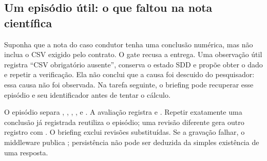 \subsection{Um episódio útil: o que faltou na nota científica}

Suponha que a nota do caso condutor tenha uma conclusão numérica, mas não
inclua o CSV exigido pelo contrato. O gate recusa a entrega. Uma observação
útil registra ``CSV obrigatório ausente'', conserva o estado SDD e propõe
obter o dado e repetir a verificação. Ela não conclui que a causa foi descuido
do pesquisador: essa causa não foi observada. Na tarefa seguinte, o briefing
pode recuperar esse episódio e seu identificador antes de tentar o cálculo.

\begin{arquitetura}
O episódio  separa , ,
, ,  e
. A avaliação registra  e
. Repetir exatamente uma conclusão já registrada
reutiliza o episódio; uma revisão diferente gera outro registro com
. O briefing exclui revisões substituídas. Se a gravação falhar,
o middleware publica ; persistência não pode ser
deduzida da simples existência de uma resposta.
\end{arquitetura}

